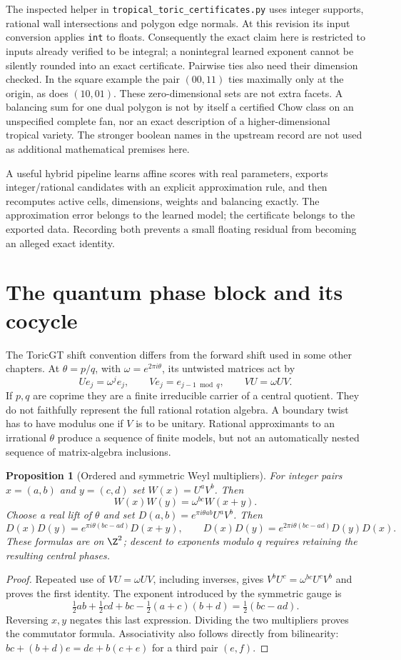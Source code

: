 \documentclass[11pt,oneside,openany]{book}
\newtheorem{proposition}[theorem]{Proposition}
\theoremstyle{definition}\newtheorem{definition}[theorem]{Definition}
\theoremstyle{remark}\newtheorem{remark}[theorem]{Remark}
\begin{document}
The inspected helper in \texttt{tropical\_toric\_certificates.py} uses
integer supports, rational wall intersections and polygon edge normals.
At this revision its input conversion applies \texttt{int} to floats.
Consequently the exact claim here is restricted to inputs already
verified to be integral; a nonintegral learned exponent cannot be silently
rounded into an exact certificate. Pairwise ties also need their dimension
checked. In the square example the pair $(00,11)$ ties maximally only at
the origin, as does $(10,01)$. These zero-dimensional sets are not extra
facets. A balancing sum for one dual polygon is not by itself a certified
Chow class on an unspecified complete fan, nor an exact description of a
higher-dimensional tropical variety. The stronger boolean names in the
upstream record are not used as additional mathematical premises here.

A useful hybrid pipeline learns affine scores with real parameters,
exports integer/rational candidates with an explicit approximation rule,
and then recomputes active cells, dimensions, weights and balancing
exactly. The approximation error belongs to the learned model; the
certificate belongs to the exported data. Recording both prevents a
small floating residual from becoming an alleged exact identity.

\section{The quantum phase block and its cocycle}
The ToricGT shift convention differs from the forward shift used in some
other chapters. At $\theta=p/q$, with $\omega=e^{2\pi i\theta}$, its
untwisted matrices act by
\[
 Ue_j=\omega^je_j,\qquad Ve_j=e_{j-1\bmod q},\qquad
 VU=\omega UV.
\]
If $p,q$ are coprime they are a finite irreducible carrier of a central
quotient. They do not faithfully represent the full rational rotation
algebra. A boundary twist has to have modulus one if $V$ is to be
unitary. Rational approximants to an irrational $\theta$ produce a
sequence of finite models, but not an automatically nested sequence of
matrix-algebra inclusions.

\begin{proposition}[Ordered and symmetric Weyl multipliers]\label{tg:cocycle}
For integer pairs $x=(a,b)$ and $y=(c,d)$ set
$W(x)=U^aV^b$. Then
\[
 W(x)W(y)=\omega^{bc}W(x+y).
\]
Choose a real lift of $\theta$ and set
$D(a,b)=e^{\pi i\theta ab}U^aV^b$. Then
\[
 D(x)D(y)=e^{\pi i\theta(bc-ad)}D(x+y),\qquad
 D(x)D(y)=e^{2\pi i\theta(bc-ad)}D(y)D(x).
\]
These formulas are on $\Z^2$; descent to exponents modulo $q$ requires
retaining the resulting central phases.
\end{proposition}
\begin{proof}
Repeated use of $VU=\omega UV$, including inverses, gives
$V^bU^c=\omega^{bc}U^cV^b$ and proves the first identity.
The exponent introduced by the symmetric gauge is
\[
 \tfrac12ab+\tfrac12cd+bc-\tfrac12(a+c)(b+d)
 =\tfrac12(bc-ad).
\]
Reversing $x,y$ negates this last expression. Dividing the two multipliers
proves the commutator formula. Associativity also follows directly from
bilinearity: $bc+(b+d)e=de+b(c+e)$ for a third pair $(e,f)$.
\end{proof}
\end{document}
